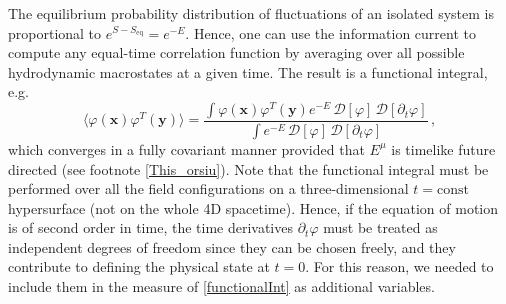 \documentclass[a4paper, amsfonts, amssymb, amsmath, reprint, showkeys, nofootinbib, twoside,notitlepage,onecolumn,preprintnumbers]{revtex4-2}
\theoremstyle{definition}
\theoremstyle{theorem}
\theoremstyle{corollary}
\begin{document}
The equilibrium probability distribution of fluctuations of an isolated system is proportional to $e^{S-S_{\text{eq}}}=e^{-E}$. Hence, one can use the information current to compute any equal-time correlation function by averaging over all possible hydrodynamic macrostates at a given time. The result is a functional integral, e.g.
\begin{equation}\label{functionalInt}
    \langle \varphi(\textbf{x}) \varphi^T(\textbf{y}) \rangle = \dfrac{\int  \varphi(\textbf{x}) \varphi^T(\textbf{y}) e^{-E} \, \mathcal{D} [\varphi] \, \mathcal{D}[\partial_t \varphi]}{\int  e^{-E} \, \mathcal{D} [\varphi] \, \mathcal{D}[\partial_t \varphi] } \, ,
    \end{equation}
which converges in a fully covariant manner provided that $E^\mu$ is timelike future directed (see footnote \ref{This_orsiu}). 
Note that the functional integral must be performed over all the field configurations on a three-dimensional $t=\text{const}$ hypersurface (not on the whole 4D spacetime). Hence, if the equation of motion is of second order in time, the time derivatives $\partial_t \varphi$ must be treated as independent degrees of freedom since they can be chosen freely, and they contribute to defining the physical state at $t=0$. For this reason, we needed to include them in the measure of \eqref{functionalInt} as additional variables.
\end{document}
